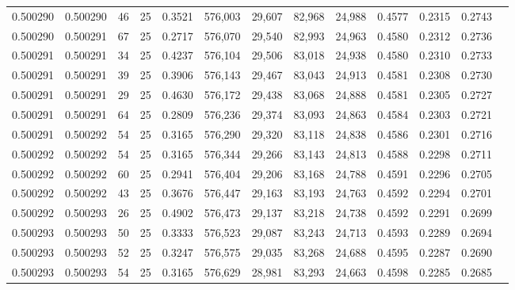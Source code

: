 \begin{tabular}{rrrrrrrrrrrrr}
0.500290 & 0.500290 &    46 &  25 &                                     0.3521 & 576,003 &  29,607 &  82,968 &  24,988 & 0.4577 & 0.2315 & 0.2743 \\
0.500290 & 0.500291 &    67 &  25 &                                     0.2717 & 576,070 &  29,540 &  82,993 &  24,963 & 0.4580 & 0.2312 & 0.2736 \\
0.500291 & 0.500291 &    34 &  25 &                                     0.4237 & 576,104 &  29,506 &  83,018 &  24,938 & 0.4580 & 0.2310 & 0.2733 \\
0.500291 & 0.500291 &    39 &  25 &                                     0.3906 & 576,143 &  29,467 &  83,043 &  24,913 & 0.4581 & 0.2308 & 0.2730 \\
0.500291 & 0.500291 &    29 &  25 &                                     0.4630 & 576,172 &  29,438 &  83,068 &  24,888 & 0.4581 & 0.2305 & 0.2727 \\
0.500291 & 0.500291 &    64 &  25 &                                     0.2809 & 576,236 &  29,374 &  83,093 &  24,863 & 0.4584 & 0.2303 & 0.2721 \\
0.500291 & 0.500292 &    54 &  25 &                                     0.3165 & 576,290 &  29,320 &  83,118 &  24,838 & 0.4586 & 0.2301 & 0.2716 \\
0.500292 & 0.500292 &    54 &  25 &                                     0.3165 & 576,344 &  29,266 &  83,143 &  24,813 & 0.4588 & 0.2298 & 0.2711 \\
0.500292 & 0.500292 &    60 &  25 &                                     0.2941 & 576,404 &  29,206 &  83,168 &  24,788 & 0.4591 & 0.2296 & 0.2705 \\
0.500292 & 0.500292 &    43 &  25 &                                     0.3676 & 576,447 &  29,163 &  83,193 &  24,763 & 0.4592 & 0.2294 & 0.2701 \\
0.500292 & 0.500293 &    26 &  25 &                                     0.4902 & 576,473 &  29,137 &  83,218 &  24,738 & 0.4592 & 0.2291 & 0.2699 \\
0.500293 & 0.500293 &    50 &  25 &                                     0.3333 & 576,523 &  29,087 &  83,243 &  24,713 & 0.4593 & 0.2289 & 0.2694 \\
0.500293 & 0.500293 &    52 &  25 &                                     0.3247 & 576,575 &  29,035 &  83,268 &  24,688 & 0.4595 & 0.2287 & 0.2690 \\
0.500293 & 0.500293 &    54 &  25 &                                     0.3165 & 576,629 &  28,981 &  83,293 &  24,663 & 0.4598 & 0.2285 & 0.2685 \\

\end{tabular}
